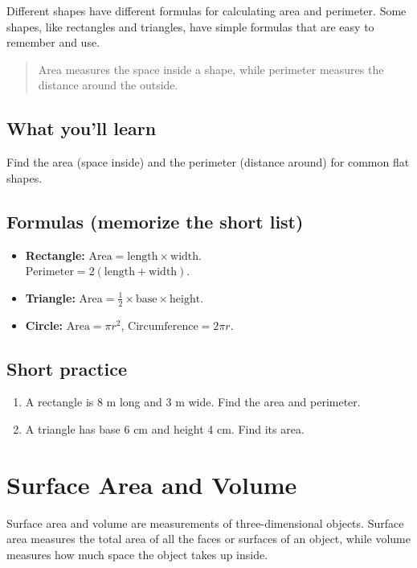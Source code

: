 Different shapes have different formulas for calculating area and perimeter. Some
shapes, like rectangles and triangles, have simple formulas that are easy to
remember and use.

\blockquote{Area measures the space inside a shape, while perimeter measures the
distance around the outside.}

\subsection{What you'll learn}

Find the area (space inside) and the perimeter (distance around) for common flat
shapes.

\subsection{Formulas (memorize the short list)}

\begin{itemize}
  \item \textbf{Rectangle:} \(\text{Area} = \text{length}\times\text{width}\). \\
        \(\text{Perimeter} = 2(\text{length} + \text{width})\).
  \item \textbf{Triangle:} \(\text{Area} = \frac{1}{2}\times\text{base}\times\text{height}\).
  \item \textbf{Circle:} \(\text{Area}=\pi r^{2}\), \(\text{Circumference}=2\pi r\).
\end{itemize}

\subsection{Short practice}

\begin{enumerate}
  \item A rectangle is 8 m long and 3 m wide. Find the area and perimeter.
  \item A triangle has base 6 cm and height 4 cm. Find its area.
\end{enumerate}


\section{Surface Area and Volume}

Surface area and volume are measurements of three-dimensional objects. Surface
area measures the total area of all the faces or surfaces of an object, while
volume measures how much space the object takes up inside.

